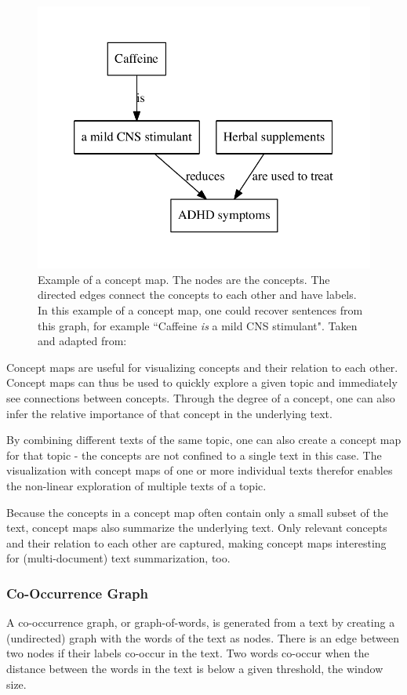 \begin{figure}[h]
\centering
\includegraphics[width=0.5\linewidth]{assets/figures/concept_map.pdf}
\caption{Example of a concept map. The nodes are the concepts. The directed edges connect the concepts to each other and have labels. In this example of a concept map, one could recover sentences from this graph, for example ``Caffeine \textit{is} a mild CNS stimulant". Taken and adapted from: \cite{Falke2017}}
\label{fig:concept_map}
\end{figure}

Concept maps are useful for visualizing concepts and their relation to each other.
Concept maps can thus be used to quickly explore a given topic and immediately see connections between concepts.
Through the degree of a concept, one can also infer the relative importance of that concept in the underlying text.

By combining different texts of the same topic, one can also create a concept map for that topic - the concepts are not confined to a single text in this case.
The visualization with concept maps of one or more individual texts therefor enables the non-linear exploration of multiple texts of a topic.

Because the concepts in a concept map often contain only a small subset of the text, concept maps also summarize the underlying text.
Only relevant concepts and their relation to each other are captured, making concept maps interesting for (multi-document) text summarization, too.




\subsubsection{Co-Occurrence Graph}
A co-occurrence graph, or graph-of-words, is generated from a text by creating a (undirected) graph with the words of the text as nodes.
There is an edge between two nodes if their labels co-occur in the text.
Two words co-occur when the distance between the words in the text is below a given threshold, the window size.

